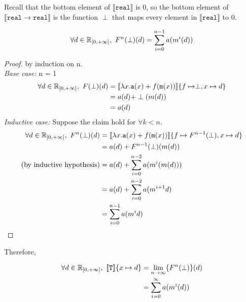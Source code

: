  Recall that the bottom element of $\llbracket \texttt{real} \rrbracket$ is $0$, so the bottom element of $\llbracket \texttt{real} 
 \rightarrow \texttt{real}\rrbracket$ is the function $\perp$ that maps every element in $\llbracket \texttt{real} \rrbracket$ to 
 $0$.  \\
 \begin{lemma}
 \begin{align*}
 \forall d \in \mathbb{R}_{[0, +\infty]}, \ F^n(\perp)(d) = \sum_{i = 0}^{n-1}a(m^{i}(d))
 \end{align*}
 \end{lemma}
 \begin{proof} by induction on n. \\
 \emph{Base case:} n = 1
 \begin{align*}
 \forall d \in \mathbb{R}_{[0,+\infty]}, \ F(\perp)(d) &= \llbracket \lambda x.\texttt{a}(x) + f (\texttt{m}(x))\rrbracket\{f \mapsto \perp, x \mapsto d\} \\
 &= a(d) + \perp(m(d)) \\
 &= a(d)  \\
 \end{align*}
 \emph{Inductive case:} Suppose the claim hold for $\forall k < n$.
 \begin{align*}
 \forall d \in \mathbb{R}_{[0,+\infty]}, \ F^n(\perp)(d) &= \llbracket \lambda x.\texttt{a}(x) + f (\texttt{m}(x))\rrbracket
 \{f \mapsto F^{n-1}(\perp),x\mapsto d\} \\
 &= a(d) + F^{n-1}(\perp)(m(d)) \\
\text{(by inductive hypothesis)} &= a(d) 
					    + \sum_{i = 0}^{n-2}a(m^{i}(m(d))) \\
&= a(d) + \sum_{i = 0}^{n-2} a( m^{i+1}d) \\
&= \sum_{i=0}^{n-1} a(m^{i}d) \\
\end{align*}
\end{proof}
Therefore, 
\begin{thm}
\begin{align*}
\forall d \in \mathbb{R}_{[0,+\infty]}, \ \llbracket \texttt{T} \rrbracket\{x \mapsto d\} &= \lim_{n \to \infty}\{F^n (\perp)\}(d) \\
&= \sum_{i=0}^{\infty}a(m^{i}(d)) \\
 \end{align*}
 \end{thm}
 
